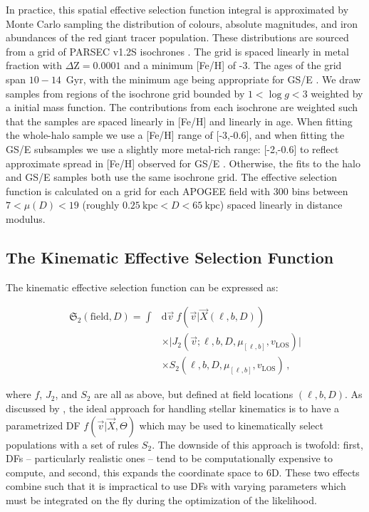 In practice, this spatial effective selection function integral is approximated by Monte Carlo sampling the distribution of colours, absolute magnitudes, and iron abundances of the red giant tracer population. These distributions are sourced from a grid of PARSEC v1.2S isochrones \parencite{bressan12}. The grid is spaced linearly in metal fraction with $\Delta \mathrm{Z} = 0.0001$ and a minimum [Fe/H] of -3. The ages of the grid span $10-14$~Gyr, with the minimum age being appropriate for GS/E \parencite{montalban21}. We draw samples from regions of the isochrone grid bounded by $1 < \log g < 3$ weighted by a \textcite{chabrier03} initial mass function. The contributions from each isochrone are weighted such that the samples are spaced linearly in [Fe/H] and linearly in age. When fitting the whole-halo sample we use a [Fe/H] range of [-3,-0.6], and when fitting the GS/E subsamples we use a slightly more metal-rich range: [-2,-0.6] to reflect approximate spread in [Fe/H] observed for GS/E \parencite[see our Figure~\ref{ch3:fig:selection_abundances} or refer to e.g.][]{myeong19,hasselquist21,horta23a}. Otherwise, the fits to the halo and GS/E samples both use the same isochrone grid. The effective selection function is calculated on a grid for each APOGEE field with 300 bins between $7 < \mu(D) < 19$ (roughly $0.25~\mathrm{kpc} < D < 65~\mathrm{kpc}$) spaced linearly in distance modulus.

\subsection{The Kinematic Effective Selection Function}
\label{ch3:subsec:kinematic-effective-selection-function}

The kinematic effective selection function can be expressed as:

\begin{equation}
\label{ch3:eq:kinematic-effective-selection-function}
\begin{split}
    \mathfrak{S}_{2}(\mathrm{field},D) = \int & \mathrm{d} \vec{v}\ f(\vec{v} \vert \vec{X}(\ell, b, D)) \\
    & \times \lvert J_{2}(\vec{v}; \ell, b, D, \mu_{[\ell,b]}, v_{\mathrm{LOS}}) \rvert \\
    & \times S_{2}(\ell, b, D, \mu_{[\ell,b]}, v_{\mathrm{LOS}})\,,
\end{split}
\end{equation}

\noindent where $f$, $J_{2}$, and $S_{2}$ are all as above, but defined at field locations $(\ell,b,D)$. As discussed by \cite{mackereth20}, the ideal approach for handling stellar kinematics is to have a parametrized DF $f(\vec{v} \vert \vec{X}, \Theta)$ which may be used to kinematically select populations with a set of rules $S_{2}$. The downside of this approach is twofold: first, DFs -- particularly realistic ones -- tend to be computationally expensive to compute, and second, this expands the coordinate space to 6D. These two effects combine such that it is impractical to use DFs with varying parameters which must be integrated on the fly during the optimization of the likelihood.

